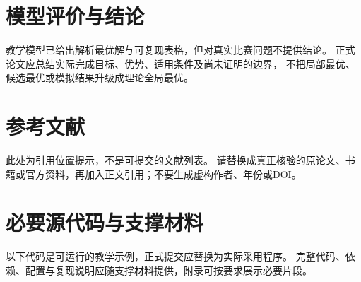 \section{模型评价与结论}
教学模型已给出解析最优解与可复现表格，但对真实比赛问题不提供结论。
正式论文应总结实际完成目标、优势、适用条件及尚未证明的边界，
不把局部最优、候选最优或模拟结果升级成理论全局最优。

\section*{参考文献}
此处为引用位置提示，不是可提交的文献列表。
请替换成真正核验的原论文、书籍或官方资料，再加入正文引用；不要生成虚构作者、年份或DOI。

\clearpage
\appendix
\section{必要源代码与支撑材料}
以下代码是可运行的教学示例，正式提交应替换为实际采用程序。
完整代码、依赖、配置与复现说明应随支撑材料提供，附录可按要求展示必要片段。

